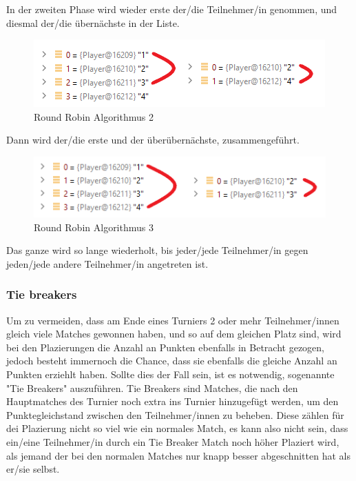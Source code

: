In der zweiten Phase wird wieder erste der/die Teilnehmer/in genommen, und diesmal der/die übernächste in der Liste. 

\begin{figure}[H]
    \includegraphics[scale=0.8]{pics/backend/roundrobin/matching_up_2.png}
    \caption{Round Robin Algorithmus 2}
\end{figure}

Dann wird der/die erste und der überübernächste, zusammengeführt.

\begin{figure}[H]
    \includegraphics[scale=0.8]{pics/backend/roundrobin/matching_up_3.png}
    \caption{Round Robin Algorithmus 3}
\end{figure}

Das ganze wird so lange wiederholt, bis jeder/jede Teilnehmer/in gegen jeden/jede andere Teilnehmer/in angetreten ist.

\subsubsection{Tie breakers}

Um zu vermeiden, dass am Ende eines Turniers 2 oder mehr Teilnehmer/innen gleich viele Matches gewonnen haben, und so auf dem gleichen Platz sind, 
wird bei den Plazierungen die Anzahl an Punkten ebenfalls in Betracht gezogen, jedoch besteht immernoch die Chance, dass sie ebenfalls die gleiche Anzahl an 
Punkten erziehlt haben. Sollte dies der Fall sein, ist es notwendig, sogenannte "Tie Breakers" auszuführen. Tie Breakers sind Matches, die nach den Hauptmatches 
des Turnier noch extra ins Turnier hinzugefügt werden, um den Punktegleichstand zwischen den Teilnehmer/innen zu beheben. Diese zählen für dei Plazierung nicht 
so viel wie ein normales Match, es kann also nicht sein, dass ein/eine Teilnehmer/in durch ein Tie Breaker Match noch höher Plaziert wird, als jemand der bei den 
normalen Matches nur knapp besser abgeschnitten hat als er/sie selbst.

